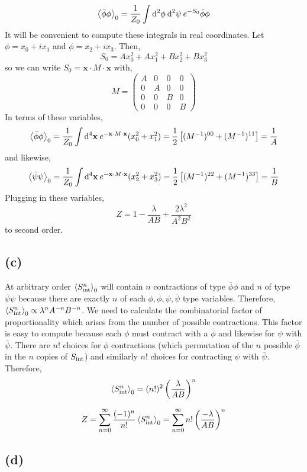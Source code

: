 \documentclass[12pt]{article}
\begin{document}
\[ \left< \bar{\phi} \phi \right>_0 = \frac{1}{Z_0} \int \mathrm{d}^{2} \phi \: \mathrm{d}^{2} \psi \: e^{- S_0} \bar{\phi} \phi \]
It will be convenient to compute these integrals in real coordinates. Let $\phi = x_0 + i x_1$ and $\phi = x_2 + i x_3$. Then,
\[ S_0 = A x_0^2 + A x_1^2 + B x_2^2 + B x_3^2 \]
so we can write $S_0 = \mathbf{x} \cdot M \cdot \mathbf{x}$ with,
\[ M = 
\begin{pmatrix}
A & 0 & 0 & 0
\\
0 & A & 0 & 0 
\\
0 & 0 & B & 0
\\
0 & 0 & 0 & B
\end{pmatrix} \] 
In terms of these variables,
\[ \left< \bar{\phi} \phi \right>_0 = \frac{1}{Z_0} \int \mathrm{d}^{4} \mathbf{x} \: e^{ - \mathbf{x} \cdot M \cdot \mathbf{x}} (x_0^2 + x_1^2) = \frac{1}{2} \left[ (M^{-1})^{00} + (M^{-1})^{11} \right] = \frac{1}{A} \]
and likewise, 
\[ \left< \bar{\psi} \psi \right>_0 = \frac{1}{Z_0} \int \mathrm{d}^{4} \mathbf{x} \: e^{ - \mathbf{x} \cdot M \cdot \mathbf{x}} (x_2^2 + x_3^2) = \frac{1}{2} \left[ (M^{-1})^{22} + (M^{-1})^{33} \right] = \frac{1}{B}  \]
Plugging in these variables,
\[ Z = 1 - \frac{\lambda}{AB} + \frac{2\lambda^2}{A^2 B^2} \]
to second order. 

\subsection{(c)}

At arbitrary order $\left< S_{\mathrm{int}}^n \right>_0$ will contain $n$ contractions of type $\bar{\phi} \phi$ and $n$ of type $\bar{\psi} \psi$ because there are exactly $n$ of each $\phi, \bar{\phi}, \psi, \bar{\psi}$ type variables. Therefore, $\left< S_{\mathrm{int}}^n \right>_0 \propto \lambda^n A^{-n} B^{-n}$. We need to calculate the combinatorial factor of proportionality which arises from the number of possible contractions. This factor is easy to compute because each $\phi$ must contract with a $\bar{\phi}$ and likewise for $\psi$ with $\bar{\psi}$. There are $n!$ choices for $\phi$ contractions (which permutation of the $n$ possible $\bar{\phi}$ in the $n$ copies of $S_{\mathrm{int}}$) and similarly $n!$ choices for contracting $\psi$ with $\bar{\psi}$. Therefore,
\[ \left< S_{\mathrm{int}}^n \right>_0 = (n!)^2 \left( \frac{\lambda}{AB} \right)^n \]

\[ Z = \sum_{n = 0}^\infty \frac{(-1)^n}{n!} \left< S_{\mathrm{int}}^n \right>_0 = \sum_{n = 0}^\infty n! \left( \frac{- \lambda}{AB} \right)^n \]

\subsection{(d)}
\end{document}
